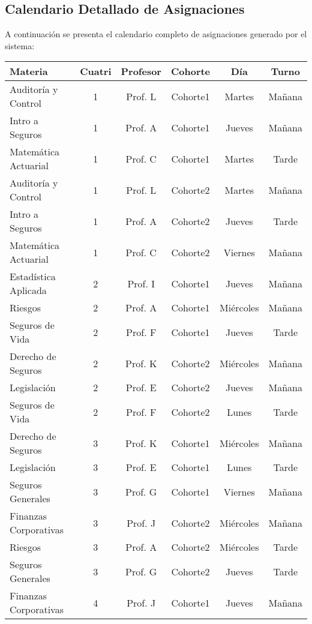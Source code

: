 \subsection{Calendario Detallado de Asignaciones}

A continuación se presenta el calendario completo de asignaciones generado por el sistema:

\begin{table}[htbp]
\centering
\small
\begin{tabular}{|p{3cm}|c|c|c|c|c|}
\hline
\textbf{Materia} & \textbf{Cuatri} & \textbf{Profesor} & \textbf{Cohorte} & \textbf{Día} & \textbf{Turno} \\
\hline
Auditoría y Control & 1 & Prof. L & Cohorte1 & Martes & Mañana \\
Intro a Seguros & 1 & Prof. A & Cohorte1 & Jueves & Mañana \\
Matemática Actuarial & 1 & Prof. C & Cohorte1 & Martes & Tarde \\
Auditoría y Control & 1 & Prof. L & Cohorte2 & Martes & Mañana \\
Intro a Seguros & 1 & Prof. A & Cohorte2 & Jueves & Tarde \\
Matemática Actuarial & 1 & Prof. C & Cohorte2 & Viernes & Mañana \\
\hline
Estadística Aplicada & 2 & Prof. I & Cohorte1 & Jueves & Mañana \\
Riesgos & 2 & Prof. A & Cohorte1 & Miércoles & Mañana \\
Seguros de Vida & 2 & Prof. F & Cohorte1 & Jueves & Tarde \\
Derecho de Seguros & 2 & Prof. K & Cohorte2 & Miércoles & Mañana \\
Legislación & 2 & Prof. E & Cohorte2 & Jueves & Mañana \\
Seguros de Vida & 2 & Prof. F & Cohorte2 & Lunes & Tarde \\
\hline
Derecho de Seguros & 3 & Prof. K & Cohorte1 & Miércoles & Mañana \\
Legislación & 3 & Prof. E & Cohorte1 & Lunes & Tarde \\
Seguros Generales & 3 & Prof. G & Cohorte1 & Viernes & Mañana \\
Finanzas Corporativas & 3 & Prof. J & Cohorte2 & Miércoles & Mañana \\
Riesgos & 3 & Prof. A & Cohorte2 & Miércoles & Tarde \\
Seguros Generales & 3 & Prof. G & Cohorte2 & Jueves & Tarde \\
\hline
Finanzas Corporativas & 4 & Prof. J & Cohorte1 & Jueves & Mañana \\

\end{tabular}
\end{table}

